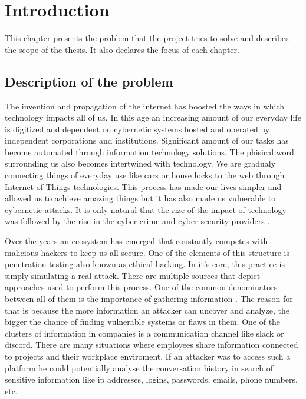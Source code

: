 \documentclass[a4paper,twoside,12pt]{book}
\newcounter{PagesWithoutNumbers}
\begin{document}
\vfill
 
 

\cleardoublepage


\pagestyle{onlyPageNumbers}
\tableofcontents

\setcounter{PagesWithoutNumbers}{\value{page}}
\mainmatter
\pagestyle{PageNumbersChapterTitles}



\chapter{Introduction}

This chapter presents the problem that the project tries to solve and describes the scope of the thesis. It also declares the focus of each chapter.

\section{Description of the problem}

The invention and propagation of the internet has boosted the ways in which technology impacts
all of us. In this age an increasing amount of our everyday life is digitized and dependent 
on cybernetic systems hosted and operated by independent corporations and institutions. Significant
amount of our tasks has become automated through information technology solutions. The phisical word 
surrounding us also becomes intertwined with technology. We are gradualy connecting things of everyday 
use like cars or house locks to the web through Internet of Things technologies. This process has 
made our lives simpler and allowed us to achieve amazing things but it has also made us vulnerable to 
cybernetic attacks. It is only natural that the rize of the impact of technology was followed 
by the rise in the cyber crime and cyber security providers \cite{bib:articleImportanceOfCybersecurity}. 

Over the years an ecosystem has emerged that constantly competes with malicious hackers to keep us all secure.
One of the elements of this structure is penetration testing also known as ethical hacking. In it's core, 
this practice is simply simulating a real attack. There are multiple sources that depict approaches 
used to perform this process. One of the common denominators between all of them is the importance of 
gathering information \cite{bib:bookEthicalHacking}. The reason for that is because the more information an attacker can uncover and analyze, 
the bigger the chance of finding vulnerable systems or flaws in them. One of the clusters of information 
in companies is a communication channel like slack or discord. There are many situations where employees 
share information connected to projects and their workplace enviroment. If an attacker was to access such a 
platform he could potentially analyse the conversation history in search of sensitive information like ip addresses, 
logins, passwords, emails, phone numbers, etc.
\end{document}
